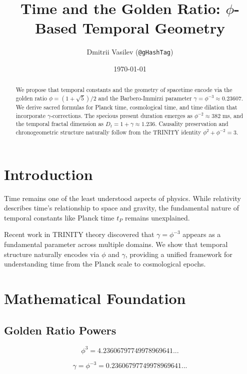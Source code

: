 \documentclass[12pt,a4paper]{article}
\title{Time and the Golden Ratio: $\phi$-Based Temporal Geometry}
\author{Dmitrii Vasilev (\texttt{@gHashTag})}
\date{\today}
\begin{document}
\maketitle

\begin{abstract}
We propose that temporal constants and the geometry of spacetime encode via the golden ratio $\phi = (1+\sqrt{5})/2$ and the Barbero-Immirzi parameter $\gamma = \phi^{-3} \approx 0.23607$. We derive sacred formulas for Planck time, cosmological time, and time dilation that incorporate $\gamma$-corrections. The specious present duration emerges as $\phi^{-2} \approx 382$ ms, and the temporal fractal dimension as $D_t = 1 + \gamma \approx 1.236$. Causality preservation and chronogeometric structure naturally follow from the TRINITY identity $\phi^2 + \phi^{-2} = 3$.
\end{abstract}

\section{Introduction}

Time remains one of the least understood aspects of physics. While relativity describes time's relationship to space and gravity, the fundamental nature of temporal constants like Planck time $t_P$ remains unexplained.

Recent work in TRINITY theory discovered that $\gamma = \phi^{-3}$ appears as a fundamental parameter across multiple domains. We show that temporal structure naturally encodes via $\phi$ and $\gamma$, providing a unified framework for understanding time from the Planck scale to cosmological epochs.

\section{Mathematical Foundation}

\subsection{Golden Ratio Powers}

\begin{equation}
\phi^3 = 4.23606797749978969641...
\end{equation}

\begin{equation}
\gamma = \phi^{-3} = 0.23606797749978969641...
\end{equation}
\end{document}
